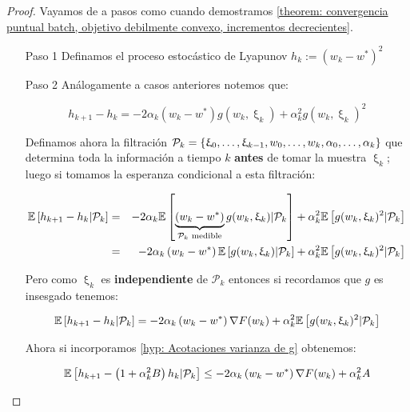 \begin{proof}
	Vayamos de a pasos como cuando demostramos \ref{theorem: convergencia puntual batch, objetivo debilmente convexo, incrementos decrecientes}.
	
	\begin{enumerate}
		\item [Paso 1] Definamos el proceso estoc\'astico de Lyapunov $h_k := \left(w_k - w^*\right)^2$
		
		\item [Paso 2] An\'alogamente a casos anteriores notemos que:
		
		\begin{equation}
			h_{k+1} - h_k = -2 \alpha_k \left(w_k - w^*\right) g(w_k, \upxi_{k}) + \alpha_k^2 g(w_k, \upxi_{k})^2
		\end{equation}
		
		Definamos ahora la filtraci\'on $\mathcal{P}_k = \left\lbrace\upxi_{0}, \dots, \upxi_{k-1}, w_0, \dots, w_k, \alpha_0, \dots, \alpha_k\right\rbrace$ que determina toda la informaci\'on a tiempo $k$ \textbf{antes} de tomar la muestra $\upxi_{k}$; luego si tomamos la esperanza condicional a esta filtraci\'on:
		
		\begin{equation*}
		\begin{aligned}
			\mathbb{E} \left[{h_{k+1} - h_k } \vert \mathcal{P}_{k}\right] & = & -2 \alpha_k \mathbb{E} \left[{\underbrace{\left(w_k - w^*\right)}_{\mathcal{P}_k \text{ medible}} g(w_k, \upxi_{k}) } \vert \mathcal{P}_{k}\right] + \alpha_k^2 \mathbb{E} \left[{g(w_k, \upxi_{k})^2} \vert \mathcal{P}_{k}\right] \\
			& = & -2 \alpha_k \left(w_k - w^*\right) \mathbb{E} \left[{g(w_k, \upxi_{k})} \vert \mathcal{P}_{k}\right] + \alpha_k^2 \mathbb{E} \left[{g(w_k, \upxi_{k})^2} \vert \mathcal{P}_{k}\right] 
		\end{aligned}
		\end{equation*}
		
		Pero como $\upxi_{k}$ es \textbf{independiente } de $\mathcal{P}_k$ entonces si recordamos que $g$ es insesgado tenemos:
		
		\begin{equation*}
		\mathbb{E} \left[{h_{k+1} - h_k } \vert \mathcal{P}_{k}\right] = -2 \alpha_k \left(w_k - w^*\right) \nabla F(w_k) + \alpha_k^2 \mathbb{E} \left[{g(w_k, \upxi_{k})^2} \vert \mathcal{P}_{k}\right] 
		\end{equation*}		
		
		Ahora si incorporamos \ref{hyp: Acotaciones varianza de g} obtenemos:
		
		\begin{equation}
			\label{eq: variaciones proceso lyapunov}
				\mathbb{E} \left[{h_{k+1} - \left(1 + \alpha_k^2 B\right)h_k } \vert \mathcal{P}_{k}\right] \leq  -2 \alpha_k \left(w_k - w^*\right) \nabla F(w_k) + \alpha_k^2 A
		\end{equation}
		

\end{enumerate}
\end{proof}
